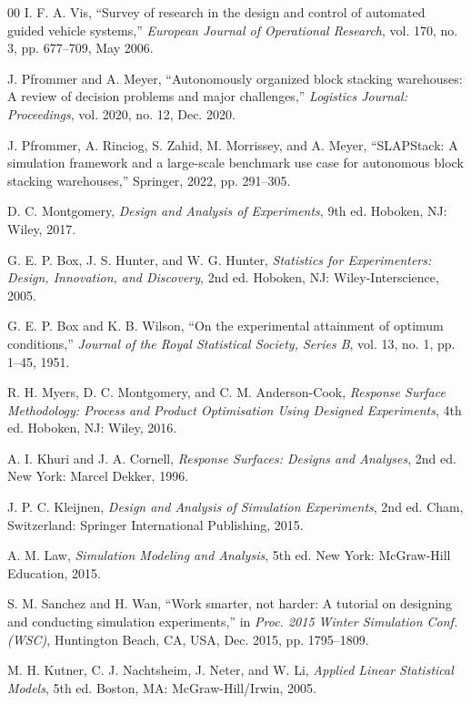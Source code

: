 \documentclass[conference]{IEEEtran}
\begin{document}
\begin{thebibliography}{00}
I. F. A. Vis, ``Survey of research in the design and control of automated guided vehicle systems,'' \emph{European Journal of Operational Research}, vol. 170, no. 3, pp. 677--709, May 2006.

J. Pfrommer and A. Meyer, ``Autonomously organized block stacking warehouses: A review of decision problems and major challenges,'' \emph{Logistics Journal: Proceedings}, vol. 2020, no. 12, Dec. 2020.

J. Pfrommer, A. Rinciog, S. Zahid, M. Morrissey, and A. Meyer, ``SLAPStack: A simulation framework and a large-scale benchmark use case for autonomous block stacking warehouses,'' Springer, 2022, pp. 291--305.

D. C. Montgomery, \emph{Design and Analysis of Experiments}, 9th ed. Hoboken, NJ: Wiley, 2017.

G. E. P. Box, J. S. Hunter, and W. G. Hunter, \emph{Statistics for Experimenters: Design, Innovation, and Discovery}, 2nd ed. Hoboken, NJ: Wiley-Interscience, 2005.

G. E. P. Box and K. B. Wilson, ``On the experimental attainment of optimum conditions,'' \emph{Journal of the Royal Statistical Society, Series B}, vol. 13, no. 1, pp. 1--45, 1951.

R. H. Myers, D. C. Montgomery, and C. M. Anderson-Cook, \emph{Response Surface Methodology: Process and Product Optimisation Using Designed Experiments}, 4th ed. Hoboken, NJ: Wiley, 2016.

A. I. Khuri and J. A. Cornell, \emph{Response Surfaces: Designs and Analyses}, 2nd ed. New York: Marcel Dekker, 1996.

J. P. C. Kleijnen, \emph{Design and Analysis of Simulation Experiments}, 2nd ed. Cham, Switzerland: Springer International Publishing, 2015.

A. M. Law, \emph{Simulation Modeling and Analysis}, 5th ed. New York: McGraw-Hill Education, 2015.

S. M. Sanchez and H. Wan, ``Work smarter, not harder: A tutorial on designing and conducting simulation experiments,'' in \emph{Proc. 2015 Winter Simulation Conf. (WSC)}, Huntington Beach, CA, USA, Dec. 2015, pp. 1795--1809.

M. H. Kutner, C. J. Nachtsheim, J. Neter, and W. Li, \emph{Applied Linear Statistical Models}, 5th ed. Boston, MA: McGraw-Hill/Irwin, 2005.


\end{thebibliography}
\end{document}
